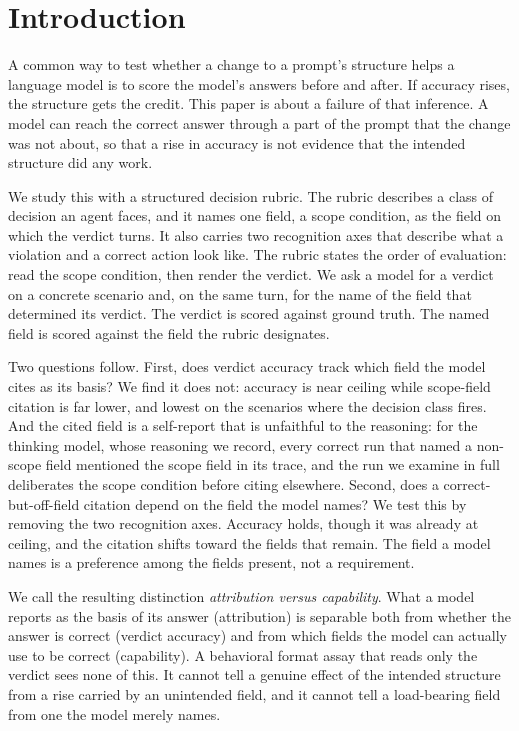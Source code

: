\documentclass[11pt,a4paper]{article}
\begin{document}
\section{Introduction}

A common way to test whether a change to a prompt's structure helps a language
model is to score the model's answers before and after. If accuracy rises, the
structure gets the credit. This paper is about a failure of that inference. A
model can reach the correct answer through a part of the prompt that the change
was not about, so that a rise in accuracy is not evidence that the intended
structure did any work.

We study this with a structured decision rubric. The rubric describes a class of
decision an agent faces, and it names one field, a scope condition, as the
field on which the verdict turns. It also carries two recognition axes that
describe what a violation and a correct action look like. The rubric states the
order of evaluation: read the scope condition, then render the verdict. We ask a
model for a verdict on a concrete scenario and, on the same turn, for the name of
the field that determined its verdict. The verdict is scored against ground
truth. The named field is scored against the field the rubric designates.

Two questions follow. First, does verdict accuracy track which field the model
cites as its basis? We find it does not: accuracy is near ceiling while
scope-field citation is far lower, and lowest on the scenarios where the decision
class fires. And the cited field is a self-report that is unfaithful to the
reasoning: for the thinking model, whose reasoning we record, every correct run
that named a non-scope field mentioned the scope field in its trace, and the run
we examine in full deliberates the scope condition before citing elsewhere.
Second, does a correct-but-off-field citation depend on the field the model
names? We test this by removing the two recognition axes. Accuracy holds, though
it was already at ceiling, and the citation shifts toward the fields that remain.
The field a model names is a preference among the fields present, not a
requirement.

We call the resulting distinction \emph{attribution versus capability}. What a
model reports as the basis of its answer (attribution) is separable both from
whether the answer is correct (verdict accuracy) and from which fields the model
can actually use to be correct (capability). A behavioral format assay that reads
only the verdict sees none of this. It cannot tell a genuine effect of the
intended structure from a rise carried by an unintended field, and it cannot tell
a load-bearing field from one the model merely names.
\end{document}
